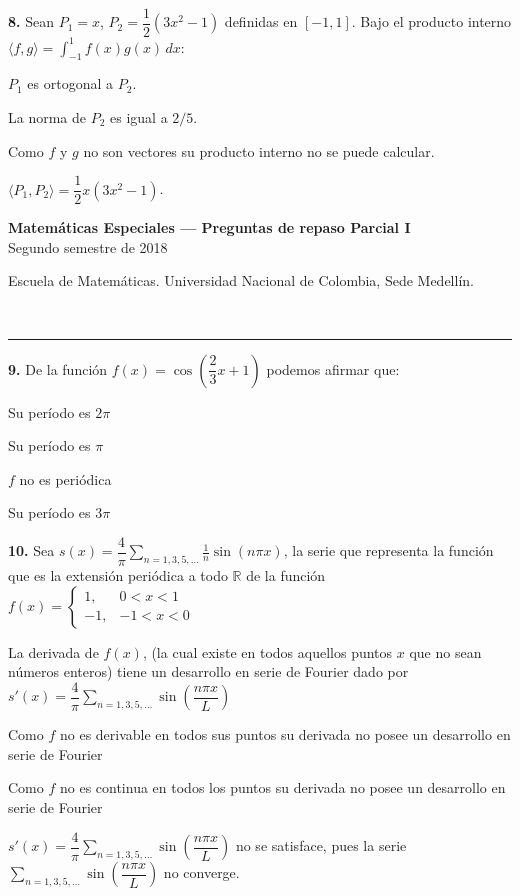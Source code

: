 \documentclass[11pt]{article}
\newcommand{\examheader}{%
  \noindent
  \begin{minipage}[t]{0.6\linewidth}
    {\small\bfseries Matem\'aticas Especiales --- Preguntas de repaso Parcial I}\\
    {\small Segundo semestre de 2018}
  \end{minipage}%
  \hfill
  \begin{minipage}[t]{0.35\linewidth}
    \raggedleft\small Escuela de Matem\'aticas. Universidad Nacional de Colombia, Sede Medell\'in.
  \end{minipage}\\[2pt]
  \rule{\linewidth}{0.6pt}
}
\begin{document}
\vspace{6pt}
\textbf{8.} Sean $P_1 = x$, $P_2 = \dfrac{1}{2}(3x^2-1)$ definidas en $[-1,1]$. Bajo el producto interno $\langle f,g\rangle = \int_{-1}^1 f(x)g(x)\,dx$:
\begin{opciones}
  \item $P_1$ es ortogonal a $P_2$.
  \item La norma de $P_2$ es igual a $2/5$.
  \item Como $f$ y $g$ no son vectores su producto interno no se puede calcular.
  \item $\langle P_1,P_2\rangle = \dfrac{1}{2}x(3x^2-1)$.
\end{opciones}

\clearpage
\examheader
\vspace{4pt}

\textbf{9.} De la funci\'on $f(x) = \cos\left(\dfrac{2}{3}x + 1\right)$ podemos afirmar que:
\begin{opciones}
  \item Su per\'iodo es $2\pi$
  \item Su per\'iodo es $\pi$
  \item $f$ no es peri\'odica
  \item Su per\'iodo es $3\pi$
\end{opciones}

\vspace{6pt}
\textbf{10.} Sea $s(x) = \dfrac{4}{\pi}\displaystyle\sum_{n=1,3,5,\ldots} \frac{1}{n}\sin(n\pi x)$, la serie que representa la funci\'on que es la extensi\'on peri\'odica a todo $\mathbb{R}$ de la funci\'on $f(x) = \begin{cases} 1, & 0<x<1 \\ -1, & -1<x<0\end{cases}$
\begin{opciones}
  \item La derivada de $f(x)$, (la cual existe en todos aquellos puntos $x$ que no sean n\'umeros enteros) tiene un desarrollo en serie de Fourier dado por $s'(x) = \dfrac{4}{\pi}\displaystyle\sum_{n=1,3,5,\ldots} \sin\left(\dfrac{n\pi x}{L}\right)$
  \item Como $f$ no es derivable en todos sus puntos su derivada no posee un desarrollo en serie de Fourier
  \item Como $f$ no es continua en todos los puntos su derivada no posee un desarrollo en serie de Fourier
  \item $s'(x) = \dfrac{4}{\pi}\displaystyle\sum_{n=1,3,5,\ldots} \sin\left(\dfrac{n\pi x}{L}\right)$ no se satisface, pues la serie $\displaystyle\sum_{n=1,3,5,\ldots} \sin\left(\dfrac{n\pi x}{L}\right)$ no converge.
\end{opciones}
\end{document}
